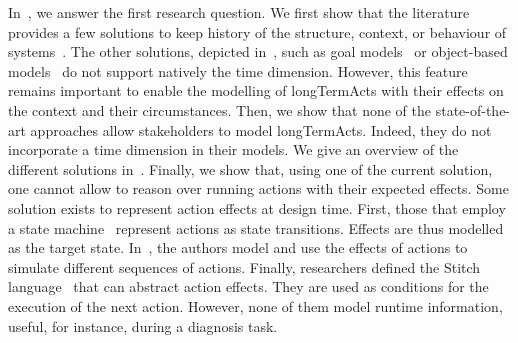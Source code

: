 In~, we answer the first research question.
We first show that the literature provides a few solutions to keep history of the \gls{structure}, \gls{context}, or \gls{behaviour} of systems~\cite{DBLP:conf/seke/0001FNMKT14, DBLP:conf/models/0001FNMKBT14, 	DBLP:conf/dbpl/MoffittS17, DBLP:conf/icse/TaharaOH17, DBLP:conf/pervasive/HenricksenIR02, DBLP:conf/smartgridsec/0001FKNT14}.
The other solutions, depicted in~,  such as goal models~ \cite{DBLP:conf/icse/CailliauL17, DBLP:conf/icse/IftikharW14a, DBLP:conf/icse/MendoncaAR14, DBLP:conf/icse/ChenPYNZ14, DBLP:conf/re/BaresiPS10} or object-based models~\cite{DBLP:conf/pervasive/HenricksenIR02, DBLP:conf/smartgridsec/0001FKNT14, DBLP:conf/icse/TaharaOH17} do not support natively the time dimension.
However, this feature remains important to enable the modelling of \glspl{longTermAct} with their effects on the context and their \glspl{circumstance}.
Then, we show that none of the state-of-the-art approaches allow stakeholders to model \glspl{longTermAct}.
Indeed, they do not incorporate a time dimension in their models.
We give an overview of the different solutions in~.
Finally, we show that, using one of the current solution, one cannot  allow to reason over running actions with their expected effects.
Some solution exists to represent action effects at design time.
First, those that employ a state machine~\cite{DBLP:conf/sigsoft/MorenoCGS15, DBLP:conf/kbse/FilieriGLM11,DBLP:conf/wetice/DjoudiBZ14, DBLP:conf/aosd/ZhangGC09, DBLP:conf/icse/GhezziPST13, DBLP:conf/kbse/TajalliGEM10} represent actions as state transitions.
Effects are thus modelled as the target state.
In~\cite{DBLP:conf/smartgridsec/0001FKNT14}, the authors model and use the effects of actions to simulate different sequences of actions.
Finally, researchers defined the Stitch language~\cite{DBLP:journals/jss/ChengG12} that can abstract action effects.
They are used as conditions for the execution of the next action.
However, none of them model runtime information, useful, for instance, during a diagnosis task.

